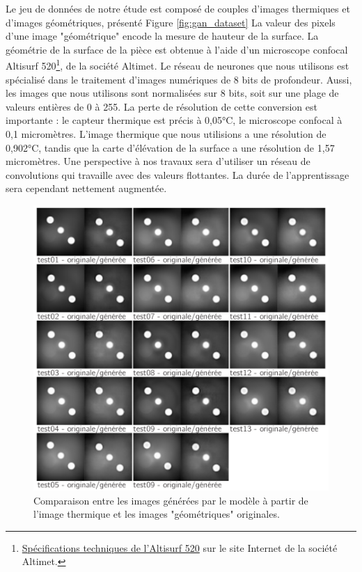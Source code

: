 Le jeu de données de notre étude est composé de couples d'images thermiques et d'images géométriques, présenté Figure \ref{fig:gan_dataset}
La valeur des pixels d'une image "géométrique" encode la mesure de hauteur de la surface.
La géométrie de la surface de la pièce est obtenue à l'aide d'un microscope confocal Altisurf 520\footnote{\href{https://www.altimet.fr/?page_id=236}{Spécifications techniques de l'Altisurf 520} sur le site Internet de la société Altimet.}, de la société Altimet.
Le réseau de neurones que nous utilisons est spécialisé dans le traitement d'images numériques de 8 bits de profondeur.
Aussi, les images que nous utilisons sont normalisées sur 8 bits, soit sur une plage de valeurs entières de 0 à 255.
La perte de résolution de cette conversion est importante : le capteur thermique est précis à 0,05°C, le microscope confocal à 0,1 micromètres.
L'image thermique que nous utilisions a une résolution de 0,902°C, tandis que la carte d'élévation de la surface a une résolution de 1,57 micromètres.
Une perspective à nos travaux sera d'utiliser un réseau de convolutions qui travaille avec des valeurs flottantes.
La durée de l'apprentissage sera cependant nettement augmentée.

\begin{figure}[tbph]
	\centering
	\includegraphics[width=\textwidth]{../Chap2/Figures/sapristi_GAN_thermo_geo_testSet.pdf}
	\caption{Comparaison entre les images générées par le modèle à partir de l'image thermique et les images "géométriques" originales.}
	\label{fig:gan_results}
\end{figure}

